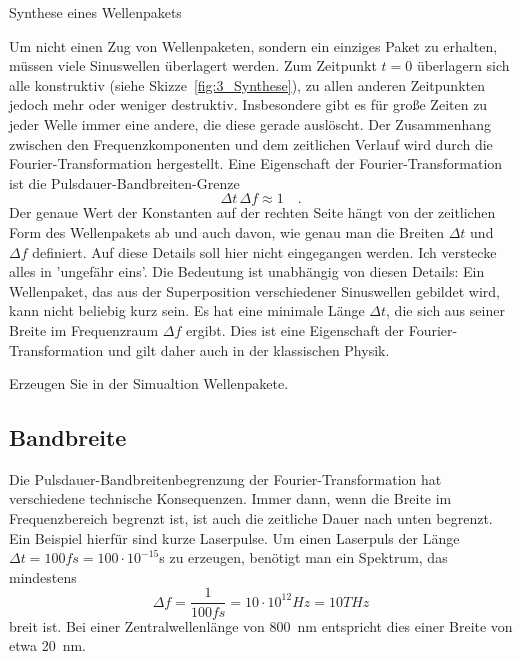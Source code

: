 \begin{marginfigure}
    \caption{Synthese eines Wellenpakets}
    \label{fig:3_Synthese}
\end{marginfigure}


Um nicht einen Zug von Wellenpaketen, sondern ein einziges Paket zu erhalten, müssen viele Sinuswellen überlagert werden. Zum Zeitpunkt $t=0$ überlagern sich alle konstruktiv (siehe Skizze~\ref{fig:3_Synthese}), zu allen anderen Zeitpunkten jedoch mehr oder weniger destruktiv. Insbesondere gibt es für große Zeiten zu jeder Welle immer eine andere, die diese gerade auslöscht. Der Zusammenhang zwischen den Frequenzkomponenten und dem zeitlichen Verlauf wird durch die Fourier-Transformation hergestellt. Eine Eigenschaft der Fourier-Transformation ist die Pulsdauer-Bandbreiten-Grenze
\begin{equation}
    \Delta t \, \Delta f \approx 1 \quad .
\end{equation}
Der genaue Wert der Konstanten auf der rechten Seite hängt von der zeitlichen Form des Wellenpakets ab und auch davon, wie genau man die Breiten $\Delta t$ und $\Delta f$ definiert. Auf diese Details soll hier nicht eingegangen werden. Ich verstecke alles in 'ungefähr eins'. Die Bedeutung ist unabhängig von diesen Details: Ein Wellenpaket, das aus der Superposition verschiedener Sinuswellen gebildet wird, kann nicht beliebig kurz sein. Es hat eine minimale Länge $\Delta t$, die sich aus seiner Breite im Frequenzraum $\Delta f$ ergibt. Dies ist eine Eigenschaft der Fourier-Transformation und gilt daher auch in der klassischen Physik.


\begin{questions}
    \item Erzeugen Sie in der Simualtion Wellenpakete.
\end{questions}

\subsection{Bandbreite}

Die Pulsdauer-Bandbreitenbegrenzung der Fourier-Transformation hat verschiedene technische Konsequenzen. Immer dann, wenn die Breite im Frequenzbereich begrenzt ist, ist auch die zeitliche Dauer nach unten begrenzt. Ein Beispiel hierfür sind kurze Laserpulse. Um einen Laserpuls der Länge $\Delta t = 100 fs = 100 \cdot 10^{-15}$s zu erzeugen, benötigt man ein Spektrum, das mindestens 
\begin{equation}
    \Delta f = \frac{1}{100 fs} = 10 \cdot 10^{12} Hz = 10 THz
\end{equation}
breit ist. Bei einer Zentralwellenlänge von 800~nm entspricht dies einer Breite von etwa 20~nm.


